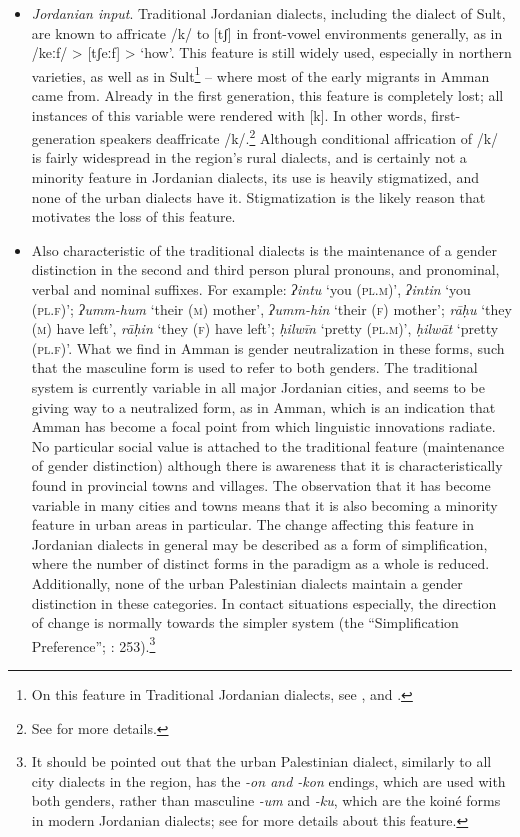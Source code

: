 \documentclass[output=paper]{langsci/langscibook}
\begin{document}
\begin{itemize}
\item \textit{Jordanian input}. Traditional Jordanian dialects, including the dialect of Sult, are known to affricate /k/ to [tʃ] in front-vowel environments generally, as in /keːf/ > [tʃeːf] > ‘how’. This feature is still widely used, especially in northern varieties, as well as in Sult\footnote{On this feature in Traditional Jordanian dialects, see \citet{Al-Hawamdeh2015}, \citet{Herin2010} and  \citet{HerinAl-wer2013}.} – where most of the early migrants in Amman came from. Already in the first generation, this feature is completely lost; all instances of this variable were rendered with [k]. In other words, first-generation speakers deaffricate /k/.\footnote{See \citet{Al-Wer2007} for more details.} Although conditional affrication of /k/ is fairly widespread in the region’s rural dialects, and is certainly not a minority feature in Jordanian dialects, its use is heavily stigmatized, and none of the urban dialects have it. Stigmatization is the likely reason that motivates the loss of this feature.

\item Also characteristic of the traditional dialects is the maintenance of a gender distinction in the second and third person plural pronouns, and pronominal, verbal and nominal suffixes. For example: \textit{ʔintu} ‘you (\textsc{pl.m})’, \textit{ʔintin} ‘you (\textsc{pl.f})’; \textit{ʔumm-hum} ‘their (\textsc{m}) mother’, \textit{ʔumm-hin} ‘their (\textsc{f}) mother’; \textit{rāḥu} ‘they (\textsc{m}) have left’, \textit{rāḥin} ‘they (\textsc{f}) have left’; \textit{ḥilwīn} ‘pretty (\textsc{pl.m})’, \textit{ḥilwāt} ‘pretty (\textsc{pl.f})'. What we find in Amman is gender neutralization in these forms, such that the masculine form is used to refer to both genders. The traditional system is currently variable in all major Jordanian cities, and seems to be giving way to a neutralized form, as in Amman, which is an indication that Amman has become a focal point from which linguistic innovations radiate. No particular social value is attached to the traditional feature (maintenance of gender distinction) although there is awareness that it is characteristically found in provincial towns and villages. The observation that it has become variable in many cities and towns means that it is also becoming a minority feature in urban areas in particular. The change affecting this feature in Jordanian dialects in general may be described as a form of simplification, where the number of distinct forms in the paradigm as a whole is reduced. Additionally, none of the urban Palestinian dialects maintain a gender distinction in these categories. In contact situations especially, the direction of change is normally towards the simpler system (the “Simplification Preference”; \citealt{Lass1997}: 253).\footnote{It should be pointed out that the urban Palestinian dialect, similarly to all city dialects in the region, has the \textit{{}-on and -kon} endings, which are used with both genders, rather than masculine \textit{{}-um} and \textit{{}-ku}, which are the koiné forms in modern Jordanian dialects; see \citet{Al-Wer2003kum} for more details about this feature.} 


\end{itemize}
\end{document}
